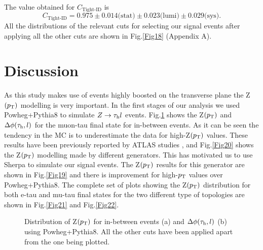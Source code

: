 The value obtained for $C_{\text{Tight-ID}}$ is
\begin{equation}
C_{\text{Tight-ID}}=0.975\pm 0.014\text{(stat)}\pm 0.023\text{(lumi)}\pm 0.029\text{(sys)}.
\end{equation}
All the distributions of the relevant cuts for selecting our signal events after applying all the other cuts are shown in Fig.\ref{Fig18} (Appendix A).
\section{Discussion}
As this study makes use of events highly boosted on the transverse plane the Z$(p_\text{T})$ modelling is very important. In the first stages of our analysis we used Powheg+Pythia8 to simulate $Z\to\tau_\text{h} l$ events. Fig.\ref{Fig23} shows the Z$(p_\text{T})$ and $\Delta\phi(\tau_\text{h},l)$ for the muon-tau final state for in-between events. As it can be seen the tendency in the MC is to underestimate the data for high-Z$(p_\text{T})$ values. These results have been previously reported by ATLAS studies \cite{Aad:2019wmn}, and Fig.\ref{Fig20} shows the Z$(p_\text{T})$ modelling made by different generators. This has motivated us to use Sherpa to simulate our signal events. The Z$(p_\text{T})$ results for this generator are shown in Fig.\ref{Fig19} and there is improvement for high-$p_\text{T}$ values over Powheg+Pythia8. The complete set of plots showing the Z$(p_\text{T})$ distribution for both e-tau and mu-tau final states for the two different type of topologies are shown in Fig.\ref{Fig21} and Fig.\ref{Fig22}.
\begin{figure}[H]
	\centering
	\hfill
	\caption{Distribution of Z$(p_\text{T})$ for in-between events (a) and $\Delta\phi(\tau_\text{h},l)$ (b) using Powheg+Pythia8. All the other cuts have been applied apart from the one being plotted.}
	\label{Fig23}
\end{figure}
